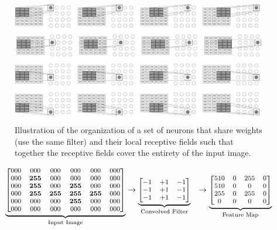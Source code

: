 \documentclass[xcolor={table}]{beamer}
\begin{document}
 \begin{frame} 
\begin{figure}
\includegraphics[width=\textwidth]{./images/fmlpda_8_33.pdf}
\caption{Illustration of the organization of a set of neurons that share weights (use the same filter) and their local receptive fields such that together the receptive fields cover the entirety of the input image.}
\label{fig:receptivefieldsorganization}
\end{figure}
\end{frame} 



 \begin{frame} 
\begin{alignat}{2}
\underbrace{
\footnotesize
\begin{bmatrix}
000 & 000 & 000 & 000 & 000 & 000\\
000 & \mathbf{255} & 000 & 000 & 000 & 000\\
000 & \mathbf{255} & 000 & \mathbf{255} & 000 & 000\\
000 & \mathbf{255} & \mathbf{255} & \mathbf{255} & \mathbf{255} & 000\\
000 & 000 & 000 & \mathbf{255} & 000 & 000\\
000 & 000 & 000 & 000 & 000 & 000\\
\end{bmatrix}
}_{\text{Input Image}}
&\rightarrow
\underbrace{
\footnotesize
\begin{bmatrix}
-1 & +1 & -1\\
-1 & +1 & -1\\
-1 & +1 & -1\\
\end{bmatrix}
}_{\text{Convolved Filter}}
&\rightarrow
\underbrace{
\footnotesize
\begin{bmatrix}
510 & 0 & 255 & 0\\
510 & 0 & 0 & 0\\
255 & 0 & 255 & 0\\
0 & 0 & 0 & 0\\
\end{bmatrix}
}_{\text{Feature Map}}
\label{eq:featuremap1}
\end{alignat}
\end{frame} 
\end{document}
